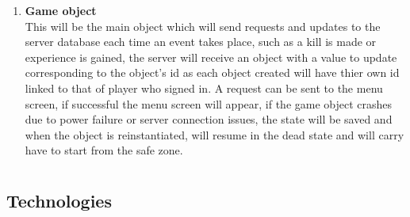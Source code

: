 \documentclass[letterpaper]{article}
\begin{document}
\begin{enumerate}
			\item \textbf{Game object}
			\\This will be the main object which will send requests and updates to the server database each time an event takes place, such as a kill is made or experience is gained, the server will receive an object with a value to update corresponding to the object's id as each object created will have thier own id linked to that of player who signed in. A request can be sent to the menu screen, if successful the menu screen will appear, if the game object crashes due to power failure or server connection issues, the state will be saved and when the object is reinstantiated, will resume in the dead state and will carry have to start from the safe zone.
			\end{enumerate}
		
		
		
		\vspace{0.2in}
		
		
		\section*{\colorbox{blue}{}} 
		\vspace{0.1in}
		
			\subsection*{Technologies}
			\vspace{0.1in}
			
\end{document}
